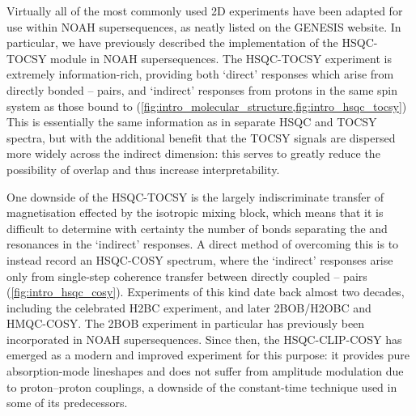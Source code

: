 \documentclass[a4paper,12pt]{article}
\newcommand{\proton}{\ch{^{1}H}}
\newcommand{\carbon}{\ch{^{13}C}}
\newcommand{\CH}{\carbon{}--\proton{}}
\newcommand{\HH}{\proton{}--\proton{}}
\begin{document}
\begin{refsection}
Virtually all of the most commonly used 2D experiments have been adapted for use within NOAH supersequences, as neatly listed on the GENESIS website\autocite{Yong2022AC}.
In particular, we have previously described the implementation of the HSQC-TOCSY module in NOAH supersequences.\autocite{Yong2021JMR}
The HSQC-TOCSY experiment is extremely information-rich, providing both `direct' responses which arise from directly bonded \CH{} pairs, and `indirect' responses from protons in the same spin system as those bound to \carbon{} (\cref{fig:intro_molecular_structure,fig:intro_hsqc_tocsy})
This is essentially the same information as in separate HSQC and TOCSY spectra, but with the additional benefit that the TOCSY signals are dispersed more widely across the \carbon{} indirect dimension: this serves to greatly reduce the possibility of overlap and thus increase interpretability.

One downside of the HSQC-TOCSY is the largely indiscriminate transfer of magnetisation effected by the isotropic mixing block, which means that it is difficult to determine with certainty the number of bonds separating the \carbon{} and \proton{} resonances in the `indirect' responses.
A direct method of overcoming this is to instead record an HSQC-COSY spectrum, where the `indirect' responses arise only from single-step coherence transfer between directly coupled \HH{} pairs (\cref{fig:intro_hsqc_cosy}).
Experiments of this kind date back almost two decades, including the celebrated H2BC experiment\autocite{Nyberg2005JACS,Nyberg2005MRC}, and later 2BOB/H2OBC\autocite{Kupce2017MRC} and HMQC-COSY\autocite{Hu2011JBNMR}.
The 2BOB experiment in particular has previously been incorporated in NOAH supersequences\autocite{Kupce2019JMR}.
Since then, the HSQC-CLIP-COSY\autocite{Gyongyosi2018CPC,Gyongyosi2021AC} has emerged as a modern and improved experiment for this purpose: it provides pure absorption-mode lineshapes and does not suffer from amplitude modulation due to proton--proton couplings, a downside of the constant-time technique used in some of its predecessors.


\end{refsection}
\end{document}
